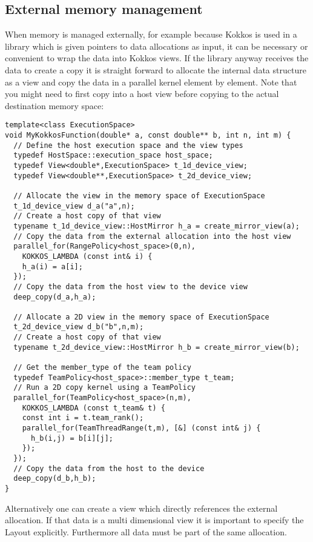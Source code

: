 \subsection{External memory management}

When memory is managed externally, for example because Kokkos is used
in a library which is given pointers to data allocations as input, it can be necessary 
or convenient to wrap the data into Kokkos views. If the library anyway receives the 
data to create a copy it is straight forward to allocate the internal data structure as a
view and copy the data in a parallel kernel element by element. Note that you might
need to first copy into a host view before copying to the actual destination memory 
space:

\begin{lstlisting}
template<class ExecutionSpace>
void MyKokkosFunction(double* a, const double** b, int n, int m) {
  // Define the host execution space and the view types
  typedef HostSpace::execution_space host_space;
  typedef View<double*,ExecutionSpace> t_1d_device_view;
  typedef View<double**,ExecutionSpace> t_2d_device_view;
  
  // Allocate the view in the memory space of ExecutionSpace
  t_1d_device_view d_a("a",n);
  // Create a host copy of that view
  typename t_1d_device_view::HostMirror h_a = create_mirror_view(a);
  // Copy the data from the external allocation into the host view
  parallel_for(RangePolicy<host_space>(0,n),
    KOKKOS_LAMBDA (const int& i) {
    h_a(i) = a[i];
  });
  // Copy the data from the host view to the device view
  deep_copy(d_a,h_a);
  
  // Allocate a 2D view in the memory space of ExecutionSpace
  t_2d_device_view d_b("b",n,m);
  // Create a host copy of that view
  typename t_2d_device_view::HostMirror h_b = create_mirror_view(b);
  
  // Get the member_type of the team policy
  typedef TeamPolicy<host_space>::member_type t_team;
  // Run a 2D copy kernel using a TeamPolicy
  parallel_for(TeamPolicy<host_space>(n,m),
    KOKKOS_LAMBDA (const t_team& t) {
    const int i = t.team_rank();
    parallel_for(TeamThreadRange(t,m), [&] (const int& j) {
      h_b(i,j) = b[i][j];
    });
  });
  // Copy the data from the host to the device
  deep_copy(d_b,h_b);
}
\end{lstlisting}

Alternatively one can create a view which directly references the external allocation.
If that data is a multi dimensional view it is important to specify the Layout explicitly.
Furthermore all data must be part of the same allocation.

